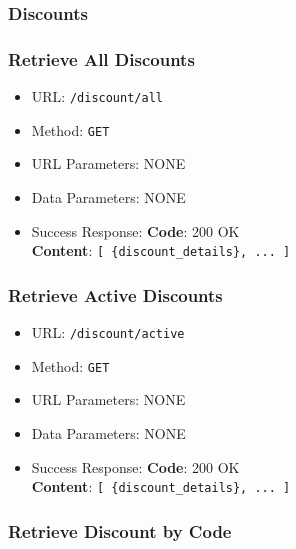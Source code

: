 \subsubsection*{Discounts}

\subsubsection*{Retrieve All Discounts}

\begin{itemize}
    \item URL: \texttt{/discount/all}
    \item Method: \texttt{GET}
    \item URL Parameters: NONE
    \item Data Parameters: NONE

    \item Success Response: \newline
    \textbf{Code}: 200 OK \\
    \textbf{Content}: \texttt{[ \{discount\_details\}, ... ]}
\end{itemize}

\subsubsection*{Retrieve Active Discounts}

\begin{itemize}
    \item URL: \texttt{/discount/active}
    \item Method: \texttt{GET}
    \item URL Parameters: NONE
    \item Data Parameters: NONE

    \item Success Response: \newline
    \textbf{Code}: 200 OK \\
    \textbf{Content}: \texttt{[ \{discount\_details\}, ... ]}
\end{itemize}

\subsubsection*{Retrieve Discount by Code}

